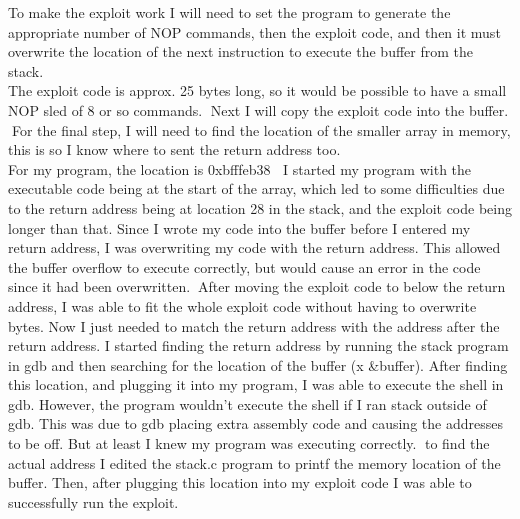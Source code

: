 \documentclass[14pt]{extarticle}
\begin{document}
To make the exploit work I will need to set the program to generate the appropriate number of NOP commands, then the exploit code, and then it must overwrite the location of the next instruction to execute the buffer from the stack. \\

The exploit code is approx. 25 bytes long, so it would be possible to have a small NOP sled of 8 or so commands. Next I will copy the exploit code into the buffer. For the final step, I will need to find the location of the smaller array in memory, this is so I know where to sent the return address too. \\
For my program, the location is 
0xbfffeb38
I started my program with the executable code being at the start of the array, which led to some difficulties due to the return address being at location 28 in the stack, and the exploit code being longer than that. Since I wrote my code into the buffer before I entered my return address, I was overwriting my code with the return address. This allowed the buffer overflow to execute correctly, but would cause an error in the code since it had been overwritten.After moving the exploit code to below the return address, I was able to fit the whole exploit code without having to overwrite bytes.
 Now I just needed to match the return address with the address after the return address. I started finding the return address by running the stack program in gdb and then searching for the location of the buffer (x &buffer). After finding this location, and plugging it into my program, I was able to execute the shell in gdb. However, the program wouldn't execute the shell if I ran stack outside of gdb. This was due to gdb placing extra assembly code and causing the addresses to be off. But at least I knew my program was executing correctly. to find the actual address I edited the stack.c program to printf the memory location of the buffer. Then, after plugging this location into my exploit code I was able to successfully run the exploit.
 
\newpage


\end{document}
